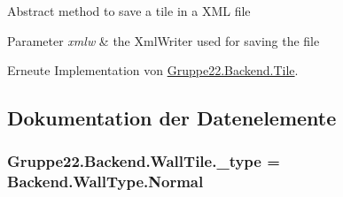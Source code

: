 Abstract method to save a tile in a X\-M\-L file 


\begin{DoxyParams}{Parameter}
{\em xmlw} & the Xml\-Writer used for saving the file\\
\hline
\end{DoxyParams}


Erneute Implementation von \hyperlink{class_gruppe22_1_1_backend_1_1_tile_a109ab3e77ffca9d44c95a711af3491dc}{Gruppe22.\-Backend.\-Tile}.



\subsection{Dokumentation der Datenelemente}
\hypertarget{class_gruppe22_1_1_backend_1_1_wall_tile_a97e9f6703a21be72980e541b16d2a98b}{
\subsubsection[{\-\_\-type}]{ Gruppe22.\-Backend.\-Wall\-Tile.\-\_\-type = Backend.\-Wall\-Type.\-Normal}}\label{class_gruppe22_1_1_backend_1_1_wall_tile_a97e9f6703a21be72980e541b16d2a98b}


